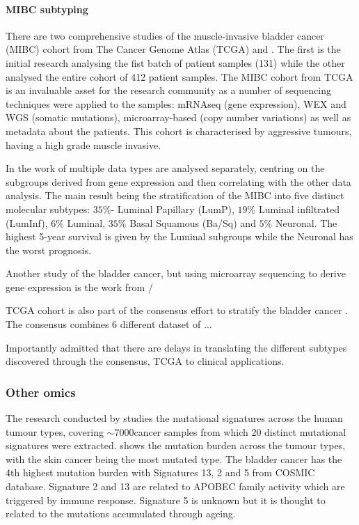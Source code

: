\paragraph*{MIBC subtyping}

There are two comprehensive studies of the muscle-invasive bladder cancer (MIBC) cohort from The Cancer Genome Atlas (TCGA) \citet{Tcga2014-dr} and \citet{Robertson2017-mg}. The first is the initial research analysing the fist batch of patient samples (131) while the other analysed the entire cohort of 412 patient samples. The MIBC cohort from TCGA is an invaluable asset for the research community as a number of sequencing techniques were applied to the samples: mRNAseq (gene expression), WEX and WGS (somatic mutations), microarray-based (copy number variations) as well as metadata about the patients. This cohort is characterised by aggressive tumours, having a high grade muscle invasive.

In the work of \citet{Robertson2017-mg} multiple data types are analysed separately, centring on the subgroups derived from gene expression and then correlating with the other data analysis. The main result being the stratification of the MIBC into five distinct molecular subtypes: $35\%$- Luminal Papillary (LumP), $19\%$ Luminal infiltrated (LumInf), $6\%$ Luminal, $35\%$ Basal Squamous (Ba/Sq) and $5\%$ Neuronal. The highest 5-year survival is given by the Luminal subgroups while the Neuronal has the worst prognosis. 

Another study of the bladder cancer, but using microarray sequencing to derive gene expression is the work from \citet{Marzouka2018-ge}/

TCGA cohort is also part of the consensus effort to stratify the bladder cancer \citet{Kamoun2020-tj}. The consensus combines 6 different dataset of ... 

Importantly \citet{Kamoun2020-tj} admitted that there are delays in translating the different subtypes discovered through the consensus, TCGA to clinical applications. 


\subsubsection{Other omics}

The research conducted by \citet{Alexandrov2013-gi} studies the mutational signatures across the human tumour types, covering $\sim7000 $cancer samples from which 20 distinct mutational signatures were extracted.  shows the mutation burden across the tumour types, with the skin cancer being the most mutated type. The bladder cancer has the 4th highest mutation burden with Signatures 13, 2 and 5 from COSMIC database\cite{Tate2019-yj}. Signature 2 and 13 are related to APOBEC family activity which are triggered by immune response. Signature 5 is unknown but it is thought to related to the mutations accumulated through ageing. 


